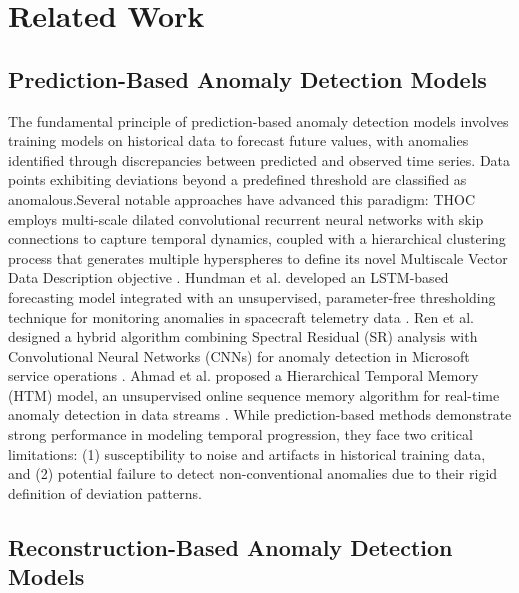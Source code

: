 \documentclass[sigconf]{acmart}
\begin{document}
\section{Related Work}

\subsection{Prediction-Based Anomaly Detection Models}

The fundamental principle of prediction-based anomaly detection models involves training 
models on historical data to forecast future values, with anomalies identified through discrepancies 
between predicted and observed time series. Data points exhibiting deviations beyond 
a predefined threshold are classified as anomalous.Several notable approaches have advanced this paradigm:
THOC employs multi-scale dilated convolutional recurrent neural networks with skip connections to capture 
temporal dynamics, coupled with a hierarchical clustering process that generates multiple hyperspheres 
to define its novel Multiscale Vector Data Description objective \cite{shen2020timeseries}.
Hundman et al. developed an LSTM-based forecasting model integrated with an unsupervised, 
parameter-free thresholding technique for monitoring anomalies in spacecraft telemetry data \cite{hundman2018detecting}.
Ren et al. designed a hybrid algorithm combining Spectral Residual (SR) analysis with Convolutional 
Neural Networks (CNNs) for anomaly detection in Microsoft service operations \cite{ren2019time}.
Ahmad et al. proposed a Hierarchical Temporal Memory (HTM) model, an unsupervised online sequence 
memory algorithm for real-time anomaly detection in data streams \cite{ahmad2017unsupervised}.
While prediction-based methods demonstrate strong performance in modeling temporal progression, 
they face two critical limitations: 
(1) susceptibility to noise and artifacts in historical training data, 
and (2) potential failure to detect non-conventional anomalies due to their rigid definition of deviation patterns.

\subsection{Reconstruction-Based Anomaly Detection Models}
\end{document}
